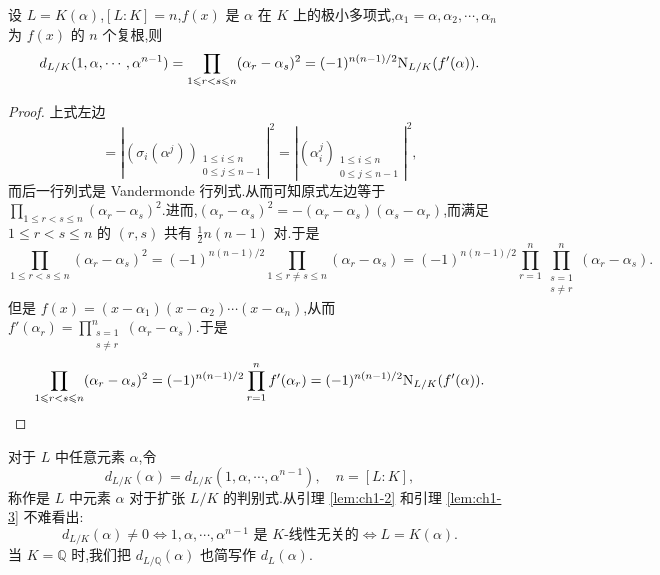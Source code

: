 \begin{lemma}\label{lem:ch1-3}
设 $L=K(\alpha)$,$[L:K]=n$,$f(x)$ 是 $\alpha$ 在 $K$ 上的极小多项式,$\alpha_1=\alpha,\alpha_2,\cdots,\alpha_n$ 为 $f(x)$ 的 $n$ 个复根,则
\[
  d_{L/K}(1,\alpha,\cdots,\alpha^{n-1})=\prod_{1\leqslant r<s\leqslant n}(\alpha_r-\alpha_s)^2
  =(-1)^{n(n-1)/2}\mathrm{N}_{L/K}(f'(\alpha)).
\]
\end{lemma}

\begin{proof}
上式左边
\[
  =\left|(\sigma_i(\alpha^j))_{\substack{1\leqslant i\leqslant n\\ 0\leqslant j\leqslant n-1}}\right|^2
  =\left|(\alpha_i^j)_{\substack{1\leqslant i\leqslant n\\ 0\leqslant j\leqslant n-1}}\right|^2,
\]
而后一行列式是 Vandermonde 行列式.从而可知原式左边等于 $\prod_{1\leqslant r<s\leqslant n}(\alpha_r-\alpha_s)^2$.进而,$(\alpha_r-\alpha_s)^2=-(\alpha_r-\alpha_s)(\alpha_s-\alpha_r)$,而满足 $1\leqslant r<s\leqslant n$ 的 $(r,s)$ 共有 $\frac{1}{2}n(n-1)$ 对.于是
\[
  \prod_{1\leqslant r<s\leqslant n}(\alpha_r-\alpha_s)^2
  =(-1)^{n(n-1)/2}\prod_{1\leqslant r\neq s\leqslant n}(\alpha_r-\alpha_s)
  =(-1)^{n(n-1)/2}\prod_{r=1}^{n}\prod_{\substack{s=1\\ s\neq r}}^{n}(\alpha_r-\alpha_s).
\]
但是 $f(x)=(x-\alpha_1)(x-\alpha_2)\cdots(x-\alpha_n)$,从而
$f'(\alpha_r)=\prod_{\substack{s=1\\ s\neq r}}^{n}(\alpha_r-\alpha_s)$.于是
\[
  \prod_{1\leqslant r<s\leqslant n}(\alpha_r-\alpha_s)^2
  =(-1)^{n(n-1)/2}\prod_{r=1}^{n}f'(\alpha_r)
  =(-1)^{n(n-1)/2}\mathrm{N}_{L/K}(f'(\alpha)).
\]
\end{proof}

\begin{remark}
对于 $L$ 中任意元素 $\alpha$,令
\[
  d_{L/K}(\alpha)=d_{L/K}(1,\alpha,\cdots,\alpha^{n-1}),\quad n=[L:K],
\]
称作是 $L$ 中元素 $\alpha$ 对于扩张 $L/K$ 的判别式.从引理 \ref{lem:ch1-2} 和引理 \ref{lem:ch1-3} 不难看出:
\[
  d_{L/K}(\alpha)\neq 0\iff 1,\alpha,\cdots,\alpha^{n-1}\text{ 是 }K\text{-线性无关的}
  \iff L=K(\alpha).
\]
当 $K=\mathbb{Q}$ 时,我们把 $d_{L/\mathbb{Q}}(\alpha)$ 也简写作 $d_L(\alpha)$.
\end{remark}

